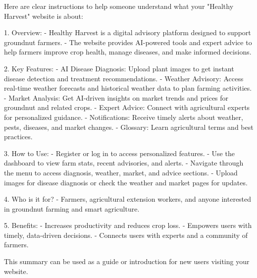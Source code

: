 Here are clear instructions to help someone understand what your "Healthy Harvest" website is about:

1. Overview:
	- Healthy Harvest is a digital advisory platform designed to support groundnut farmers.
	- The website provides AI-powered tools and expert advice to help farmers improve crop health, manage diseases, and make informed decisions.

2. Key Features:
	- AI Disease Diagnosis: Upload plant images to get instant disease detection and treatment recommendations.
	- Weather Advisory: Access real-time weather forecasts and historical weather data to plan farming activities.
	- Market Analysis: Get AI-driven insights on market trends and prices for groundnut and related crops.
	- Expert Advice: Connect with agricultural experts for personalized guidance.
	- Notifications: Receive timely alerts about weather, pests, diseases, and market changes.
	- Glossary: Learn agricultural terms and best practices.

3. How to Use:
	- Register or log in to access personalized features.
	- Use the dashboard to view farm stats, recent advisories, and alerts.
	- Navigate through the menu to access diagnosis, weather, market, and advice sections.
	- Upload images for disease diagnosis or check the weather and market pages for updates.

4. Who is it for?
	- Farmers, agricultural extension workers, and anyone interested in groundnut farming and smart agriculture.

5. Benefits:
	- Increases productivity and reduces crop loss.
	- Empowers users with timely, data-driven decisions.
	- Connects users with experts and a community of farmers.

This summary can be used as a guide or introduction for new users visiting your website.
